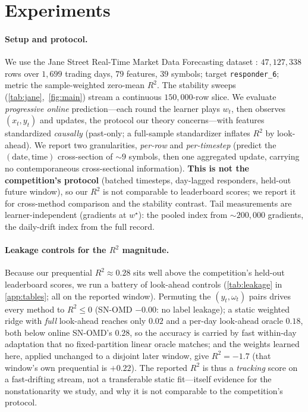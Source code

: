 \documentclass{article}
\begin{document}
\section{Experiments}
\label{sec:experiments}

\paragraph{Setup and protocol.} We use the Jane Street Real-Time Market Data Forecasting
dataset \citep{janestreet2024}: $47{,}127{,}338$ rows over $1{,}699$ trading days, $79$
features, $39$ symbols; target \texttt{responder\_6}; metric the sample-weighted zero-mean
$R^2$. The stability sweeps (\cref{tab:jane},~\cref{fig:main}) stream a continuous
$150{,}000$-row slice. We evaluate \emph{progressive online} prediction---each round the
learner plays $w_t$, then observes $(x_t,y_t)$ and updates, the protocol our theory
concerns---with features standardized \emph{causally} (past-only; a full-sample standardizer
inflates $R^2$ by look-ahead). We report two granularities, \emph{per-row} and
\emph{per-timestep} (predict the $(\text{date},\text{time})$ cross-section of $\sim\!9$
symbols, then one aggregated update, carrying no contemporaneous cross-sectional
information). \textbf{This is not the competition's protocol} (batched timesteps,
day-lagged responders, held-out future window), so our $R^2$ is not comparable to
leaderboard scores; we report it for cross-method comparison and the stability contrast.
Tail measurements are learner-independent (gradients at $w^\star$): the pooled index from
${\sim}200{,}000$ gradients, the daily-drift index from the full record.

\paragraph{Leakage controls for the $R^2$ magnitude.} Because our prequential
$R^2\approx0.28$ sits well above the competition's held-out leaderboard scores, we run a
battery of look-ahead controls (\cref{tab:leakage} in \cref{app:tables}; all on the reported
window). Permuting the $(y_t,\omega_t)$ pairs drives every method to $R^2\le0$ (SN-OMD
$-0.00$: no label leakage); a static weighted ridge with \emph{full} look-ahead reaches only
$0.02$ and a per-day look-ahead oracle $0.18$, both below online SN-OMD's $0.28$, so the
accuracy is carried by fast within-day adaptation that no fixed-partition linear oracle
matches; and the weights learned here, applied unchanged to a disjoint later window, give
$R^2=-1.7$ (that window's own prequential is $+0.22$). The reported $R^2$ is thus a
\emph{tracking} score on a fast-drifting stream, not a transferable static fit---itself
evidence for the nonstationarity we study, and why it is not comparable to the competition's
protocol.
\end{document}
